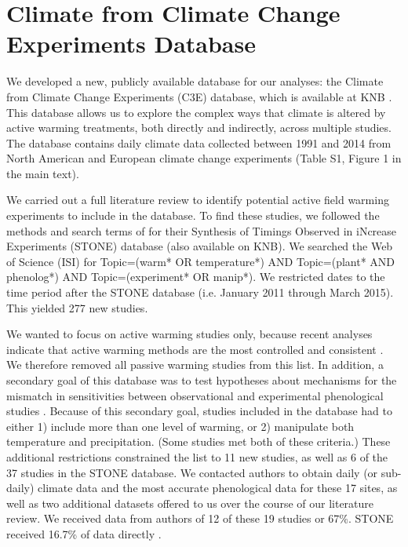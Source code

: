 \documentclass{article}
\begin{document}
\section* {Climate from Climate Change Experiments Database}
\par We developed a new, publicly available database for our analyses: the Climate from Climate Change Experiments (C3E) database, which is available at KNB \citep{ettinger2017}. This database allows us to explore the complex ways that climate is altered by active warming treatments, both directly and indirectly, across multiple studies. The database contains daily climate data collected between 1991 and 2014 from North American and European climate change experiments (Table S1, Figure 1 in the main text). 
 \par We carried out a full literature review to identify potential active field warming experiments to include in the database. To find these studies, we followed the methods and search terms of \citet{wolkovich2012} for their Synthesis of Timings Observed in iNcrease Experiments (STONE) database (also available on KNB). We searched the Web of Science (ISI) for Topic=(warm* OR temperature*) AND Topic=(plant* AND phenolog*) AND Topic=(experiment* OR manip*). We restricted dates to the time period after the STONE database (i.e. January 2011 through March 2015). This yielded 277 new studies. 
 \par We wanted to focus on active warming studies only, because recent analyses indicate that active warming methods are the most controlled and consistent \citep{kimball2005,kimball2008,aronson2009,wolkovich2012}. We therefore removed all passive warming studies from this list. In addition, a secondary goal of this database was to test hypotheses about mechanisms for the mismatch in sensitivities between observational and experimental phenological studies \citep{wolkovich2012}. Because of this secondary goal, studies included in the database had to either 1) include more than one level of warming, or 2) manipulate both temperature and precipitation. (Some studies met both of these criteria.) These additional restrictions constrained the list to 11 new studies, as well as 6 of the 37 studies in the STONE database. We contacted authors to obtain daily (or sub-daily) climate data and the most accurate phenological data for these 17 sites, as well as two additional datasets offered to us over the course of our literature review.  We received data from authors of 12 of these 19 studies or 67\%. STONE received 16.7\% of data directly \citep{wolkovich2012}.
\end{document}
